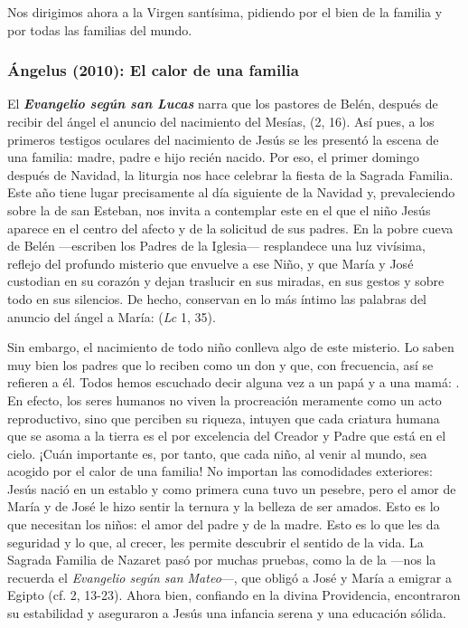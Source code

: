 \begin{body}
					Nos dirigimos ahora a la Virgen santísima, pidiendo por el bien de la familia y por todas las familias del mundo.
				\end{body}
			
			\subsubsection{Ángelus (2010): El calor de una familia}
			
				
				\begin{body}
					El \emph{\textbf{Evangelio según san Lucas}} narra que los pastores de Belén, después de recibir del ángel el anuncio del nacimiento del Mesías,  (2, 16). Así pues, a los primeros testigos oculares del nacimiento de Jesús se les presentó la escena de una familia: madre, padre e hijo recién nacido. Por eso, el primer domingo después de Navidad, la liturgia nos hace celebrar la fiesta de la Sagrada Familia. Este año tiene lugar precisamente al día siguiente de la Navidad y, prevaleciendo sobre la de san Esteban, nos invita a contemplar este  en el que el niño Jesús aparece en el centro del afecto y de la solicitud de sus padres. En la pobre cueva de Belén ---escriben los Padres de la Iglesia--- resplandece una luz vivísima, reflejo del profundo misterio que envuelve a ese Niño, y que María y José custodian en su corazón y dejan traslucir en sus miradas, en sus gestos y sobre todo en sus silencios. De hecho, conservan en lo más íntimo las palabras del anuncio del ángel a María:  (\emph{Lc} 1, 35).
					
					Sin embargo, el nacimiento de todo niño conlleva algo de este misterio. Lo saben muy bien los padres que lo reciben como un don y que, con frecuencia, así se refieren a él. Todos hemos escuchado decir alguna vez a un papá y a una mamá: . En efecto, los seres humanos no viven la procreación meramente como un acto reproductivo, sino que perciben su riqueza, intuyen que cada criatura humana que se asoma a la tierra es el  por excelencia del Creador y Padre que está en el cielo. ¡Cuán importante es, por tanto, que cada niño, al venir al mundo, sea acogido por el calor de una familia! No importan las comodidades exteriores: Jesús nació en un establo y como primera cuna tuvo un pesebre, pero el amor de María y de José le hizo sentir la ternura y la belleza de ser amados. Esto es lo que necesitan los niños: el amor del padre y de la madre. Esto es lo que les da seguridad y lo que, al crecer, les permite descubrir el sentido de la vida. La Sagrada Familia de Nazaret pasó por muchas pruebas, como la de la  ---nos la recuerda el \emph{Evangelio según san Mateo}---, que obligó a José y María a emigrar a Egipto (cf. 2, 13-23). Ahora bien, confiando en la divina Providencia, encontraron su estabilidad y aseguraron a Jesús una infancia serena y una educación sólida.
					

\end{body}
